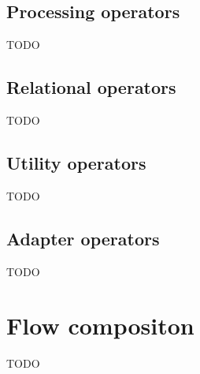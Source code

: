 \subsection{Processing operators}
TODO

\subsection{Relational operators}
TODO

\subsection{Utility operators}
TODO

\subsection{Adapter operators}
TODO

\section{Flow compositon}
TODO
